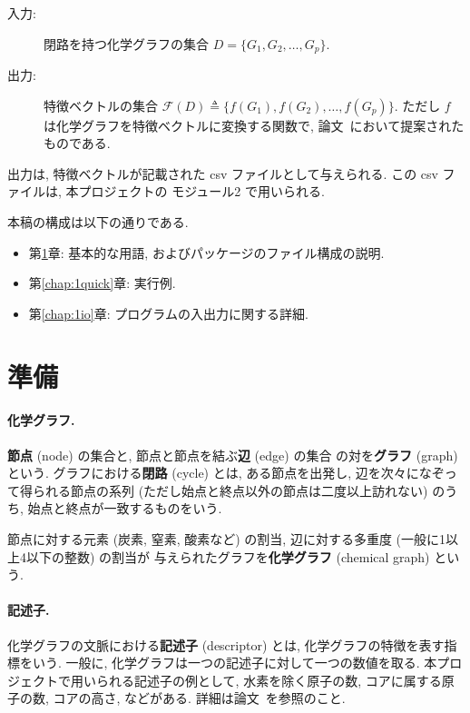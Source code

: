 \documentclass[11pt,titlepage,dvipdfmx,twoside]{jsbook}
\newcommand{\chapref}[1]{第\ref{chap:#1}章}
\begin{document}
\begin{oframed}
\begin{description}
\item[入力:] 閉路を持つ化学グラフの集合 $D=\{G_1,G_2,\dots,G_p\}$. 
\item[出力:] 特徴ベクトルの集合 ${\mathcal F}(D)\triangleq\{f(G_1),f(G_2),\dots,f(G_p)\}$.
  ただし $f$ は化学グラフを特徴ベクトルに変換する関数で,
  論文~\cite{cyclic_BH_arxiv}において提案されたものである. 
\end{description}
\end{oframed}
出力は, 特徴ベクトルが記載された csv ファイルとして与えられる.
この csv ファイルは, 本プロジェクトの モジュール2 で用いられる. 

本稿の構成は以下の通りである. 
\begin{itemize}
\item \chapref{1preparation}: 基本的な用語, およびパッケージのファイル構成の説明. 
\item \chapref{1quick}: 実行例. 
\item \chapref{1io}: プログラムの入出力に関する詳細. 
\end{itemize}

\section{準備}
\label{chap:1preparation}

\paragraph{化学グラフ.}
{\bf 節点} (node) の集合と, 節点と節点を結ぶ{\bf 辺} (edge) の集合
の対を{\bf グラフ} (graph) という.
グラフにおける{\bf 閉路} (cycle) とは,
ある節点を出発し, 辺を次々になぞって得られる節点の系列
(ただし始点と終点以外の節点は二度以上訪れない) のうち, 始点と終点が一致するものをいう.

節点に対する元素 (炭素, 窒素, 酸素など) の割当, 
辺に対する多重度 (一般に1以上4以下の整数) の割当が
与えられたグラフを{\bf 化学グラフ} (chemical graph) という. 

\paragraph{記述子.}
化学グラフの文脈における{\bf 記述子} (descriptor) とは, 化学グラフの特徴を表す指標をいう.
一般に, 化学グラフは一つの記述子に対して一つの数値を取る.
本プロジェクトで用いられる記述子の例として,
水素を除く原子の数, コアに属する原子の数, コアの高さ, などがある. 
詳細は論文~\cite{cyclic_BH_arxiv}を参照のこと. 
\end{document}

